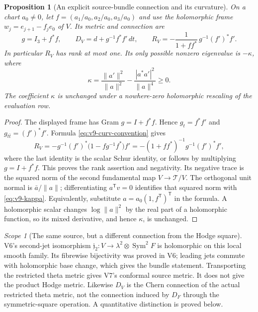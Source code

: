 \documentclass[11pt]{article}
\newtheorem{proposition}[proposition]{Proposition}
\theoremstyle{definition}
\theoremstyle{remark}
\newtheorem{scope}[scope]{Scope}
\begin{document}
\begin{proposition}[An explicit source-bundle connection and its curvature]
\label{prop:v9-theta-curvature}
On a chart $a_0\ne0$, let $f=(a_1/a_0,a_2/a_0,a_3/a_0)$ and use the
holomorphic frame $w_j=e_{j+1}-f_j e_0$ of $V$. Its metric and connection
are
\begin{equation}
 \boxed{g=I_3+f^*f,\qquad
 D_V=d+g^{-1}f^*f'\,dt,\qquad
 R_V=-\frac1{1+ff^*}\,g^{-1}(f')^*f'.}
 \label{eq:v9-theta-connection}
\end{equation}
In particular $R_V$ has rank at most one. Its only possible nonzero
eigenvalue is $-\kappa$, where
\begin{equation}
 \boxed{\kappa=
 \frac{\|a'\|^2}{\|a\|^2}
 -\frac{|a^*a'|^2}{\|a\|^4}\ge0.}
 \label{eq:v9-kappa}
\end{equation}
The coefficient $\kappa$ is unchanged under a nowhere-zero holomorphic
rescaling of the evaluation row.
\end{proposition}
\begin{proof}
The displayed frame has Gram $g=I+f^*f$. Hence $g_t=f^*f'$ and
$g_{t\bar t}=(f')^*f'$. Formula \cref{eq:v9-curv-convention} gives
\[
 R_V=-g^{-1}(f')^*\bigl(1-fg^{-1}f^*\bigr)f'
     =-(1+ff^*)^{-1}g^{-1}(f')^*f',
\]
where the last identity is the scalar Schur identity, or follows by
multiplying $g=I+f^*f$. This proves the rank assertion and negativity.
Its negative trace is the squared norm of the second fundamental map
$V\to\mathcal T/V$. The orthogonal unit normal is $\bar a/\|a\|$;
differentiating $a^{\mathsf T}v=0$ identifies that squared norm with
\cref{eq:v9-kappa}. Equivalently, substitute $a=a_0(1,f^{\mathsf T})^{\mathsf T}$
in the formula. A holomorphic scalar changes $\log\|a\|^2$ by the
real part of a holomorphic function, so its mixed derivative, and hence
$\kappa$, is unchanged.
\end{proof}

\begin{scope}[The same source, but a different connection from the Hodge square]
V6's second-jet isomorphism $\mathfrak j_2:V\to\lambda^2\otimes
\operatorname{Sym}^2F$ is holomorphic on this local smooth family. Its
fibrewise bijectivity was proved in V6; leading jets commute with holomorphic
base change, which gives the bundle statement. Transporting the restricted
theta metric gives V7's conformal source metric. It does not give the
product Hodge metric. Likewise $D_V$ is the Chern connection of the actual
restricted theta metric, not the connection induced by $D_F$ through the
symmetric-square operation. A quantitative distinction is proved below.
\end{scope}
\end{document}
